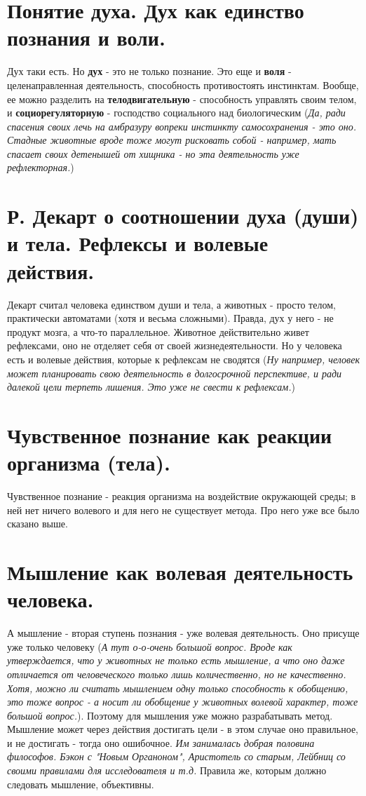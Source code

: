 \section{ Понятие духа. Дух как единство познания и воли.}
Дух таки есть. Но \textbf{дух} - это не только познание. Это еще и \textbf{воля} - целенаправленная деятельность, способность противостоять инстинктам. Вообще, ее можно разделить на \textbf{телодвигательную} - способность управлять своим телом, и \textbf{социорегуляторную} - господство социального над биологическим (\textit{Да, ради спасения своих лечь на амбразуру вопреки инстинкту самосохранения - это оно. Стадные животные вроде тоже могут рисковать собой - например, мать спасает своих детенышей от хищника - но эта деятельность уже рефлекторная.})

\section{ Р. Декарт о соотношении духа (души) и тела. Рефлексы и волевые действия.}
Декарт считал человека единством души и тела, а животных - просто телом, практически автоматами (хотя и весьма сложными). Правда, дух у него - не продукт мозга, а что-то параллельное. Животное действительно живет рефлексами, оно не отделяет себя от своей жизнедеятельности. Но у человека есть и волевые действия, которые к рефлексам не сводятся (\textit{Ну например, человек может планировать свою деятельность в долгосрочной перспективе, и ради далекой цели терпеть лишения. Это уже не свести к рефлексам.})

\section{ Чувственное познание как реакции организма (тела).}
Чувственное познание - реакция организма на воздействие окружающей среды; в ней нет ничего волевого и для него не существует метода. Про него уже все было сказано выше.

\section{ Мышление как волевая деятельность человека.}
А мышление - вторая ступень познания - уже волевая деятельность. Оно присуще уже только человеку (\textit{А тут о-о-очень большой вопрос. Вроде как утверждается, что у животных не только есть мышление, а что оно даже отличается от человеческого только лишь количественно, но не качественно. Хотя, можно ли считать мышлением одну только способность к обобщению, это тоже вопрос - а носит ли обобщение у животных волевой характер, тоже большой вопрос.}). Поэтому для мышления уже можно разрабатывать метод. Мышление может через действия достигать цели - в этом случае оно правильное, и не достигать - тогда оно ошибочное. \textit{Им занималась добрая половина философов. Бэкон с "Новым Органоном", Аристотель со старым, Лейбниц со своими правилами для исследователя и т.д.} Правила же, которым должно следовать мышление, объективны.

